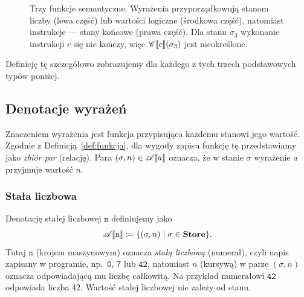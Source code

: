 \documentclass[11pt,a4paper]{article}
\theoremstyle{definition}
\theoremstyle{plain}
\DeclarePairedDelimiter{\semdelim}{\llbracket}{\rrbracket}
\newcommand{\sem}[1]{\semdelim{#1}}
\newcommand{\Cc}{\mathscr{C}}   %
\newcommand{\Aa}{\mathscr{A}}   %
\newcommand{\Store}{\textbf{Store}}
\begin{document}
\begin{figure}[H]
	\caption{Trzy funkcje semantyczne. Wyrażenia przyporządkowują stanom
		liczby (lewa część) lub wartości logiczne (środkowa część), natomiast
		instrukcje --- stany końcowe (prawa część). Dla stanu $\sigma_3$
		wykonanie instrukcji $c$ się nie kończy, więc $\Cc\sem{c}(\sigma_3)$
		jest nieokreślone.}
	\label{fig:funkcje_semantyczne}
\end{figure}

Definicję tę szczegółowo zobrazujemy dla każdego z tych trzech podstawowych
typów poniżej.

\subsection{Denotacje wyrażeń}\label{subsec:denotacje_wyrazen}

Znaczeniem wyrażenia jest funkcja przypisująca każdemu stanowi jego
wartość. Zgodnie z Definicją~\ref{def:funkcja}, dla wygody zapisu
funkcję tę przedstawiamy jako \emph{zbiór par} (relację). Para
$(\sigma,n)\in\Aa\sem{a}$ oznacza, że w stanie $\sigma$ wyrażenie $a$
przyjmuje wartość $n$.

\subsubsection{Stała liczbowa}

Denotację stałej liczbowej $\mathtt{n}$ definiujemy jako
\[
\Aa\sem{\mathtt{n}}\coloneqq \{(\sigma,n)\mid \sigma\in\Store\}.
\]
Tutaj $\mathtt{n}$ (krojem maszynowym) oznacza \emph{stałą liczbową}
(numerał), czyli napis zapisany w programie, np.\ $\mathtt{0}$, $\mathtt{7}$
lub $\mathtt{42}$, natomiast $n$ (kursywą) w parze $(\sigma,n)$ oznacza
odpowiadającą mu liczbę całkowitą. Na przykład numerałowi $\mathtt{42}$
odpowiada liczba $42$. Wartość stałej liczbowej nie zależy od stanu.
\end{document}
